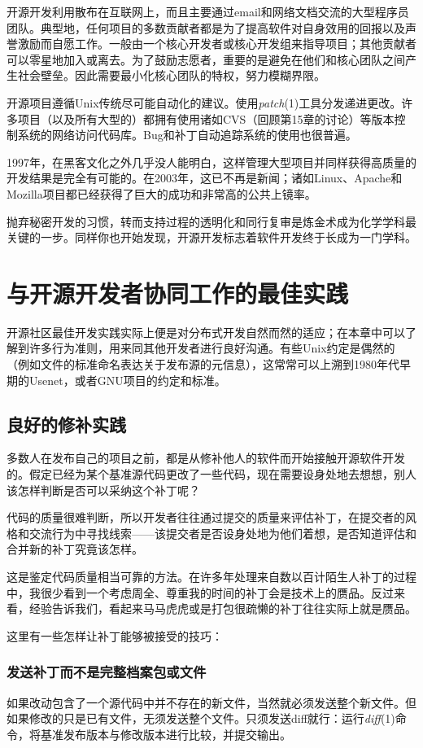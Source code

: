 \documentclass[12pt,oneside]{ctexbook}
\begin{document}
\begin{common-format}
开源开发利用散布在互联网上，而且主要通过email和网络文档交流的大型程序员团队。典型地，任何项目的多数贡献者都是为了提高软件对自身效用的回报以及声誉激励而自愿工作。一般由一个核心开发者或核心开发组来指导项目；其他贡献者可以零星地加入或离去。为了鼓励志愿者，重要的是避免在他们和核心团队之间产生社会壁垒。因此需要最小化核心团队的特权，努力模糊界限。

开源项目遵循Unix传统尽可能自动化的建议。使用\textit{patch}(1)工具分发递进更改。许多项目（以及所有大型的）都拥有使用诸如CVS（回顾第15章的讨论）等版本控制系统的网络访问代码库。Bug和补丁自动追踪系统的使用也很普遍。

1997年，在黑客文化之外几乎没人能明白，这样管理大型项目并同样获得高质量的开发结果是完全有可能的。在2003年，这已不再是新闻；诸如Linux、Apache和Mozilla项目都已经获得了巨大的成功和非常高的公共上镜率。

抛弃秘密开发的习惯，转而支持过程的透明化和同行复审是炼金术成为化学学科最关键的一步。同样你也开始发现，开源开发标志着软件开发终于长成为一门学科。

\section{与开源开发者协同工作的最佳实践}
开源社区最佳开发实践实际上便是对分布式开发自然而然的适应；在本章中可以了解到许多行为准则，用来同其他开发者进行良好沟通。有些Unix约定是偶然的（例如文件的标准命名表达关于发布源的元信息），这常常可以上溯到1980年代早期的Usenet，或者GNU项目的约定和标准。

\subsection{良好的修补实践}
多数人在发布自己的项目之前，都是从修补他人的软件而开始接触开源软件开发的。假定已经为某个基准源代码更改了一些代码，现在需要设身处地去想想，别人该怎样判断是否可以采纳这个补丁呢？

代码的质量很难判断，所以开发者往往通过提交的质量来评估补丁，在提交者的风格和交流行为中寻找线索——该提交者是否设身处地为他们着想，是否知道评估和合并新的补丁究竟该怎样。

这是鉴定代码质量相当可靠的方法。在许多年处理来自数以百计陌生人补丁的过程中，我很少看到一个考虑周全、尊重我的时间的补丁会是技术上的赝品。反过来看，经验告诉我们，看起来马马虎虎或是打包很疏懒的补丁往往实际上就是赝品。

这里有一些怎样让补丁能够被接受的技巧：

\subsubsection{发送补丁而不是完整档案包或文件}
如果改动包含了一个源代码中并不存在的新文件，当然就必须发送整个新文件。但如果修改的只是已有文件，无须发送整个文件。只须发送diff就行：运行\textit{diff}(1)命令，将基准发布版本与修改版本进行比较，并提交输出。


\end{common-format}
\end{document}
